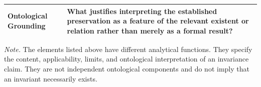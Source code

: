 \begin{table}[htbp]
\begin{tabular}{
        |p{}
        |p{}|
    }
        \textbf{Ontological Grounding}
        &
        What justifies interpreting the established
        preservation as a feature of the relevant existent
        or relation rather than merely as a formal result?
        \\ \hline

    \end{tabular}

    \normalsize

    \vspace{0.4em}

    \begin{minipage}{0.92\textwidth}
        \footnotesize
        \textit{Note.}
        The elements listed above have different analytical
        functions. They specify the content, applicability,
        limits, and ontological interpretation of an
        invariance claim. They are not independent
        ontological components and do not imply that
        an invariant necessarily exists.
    \end{minipage}

\end{table}

